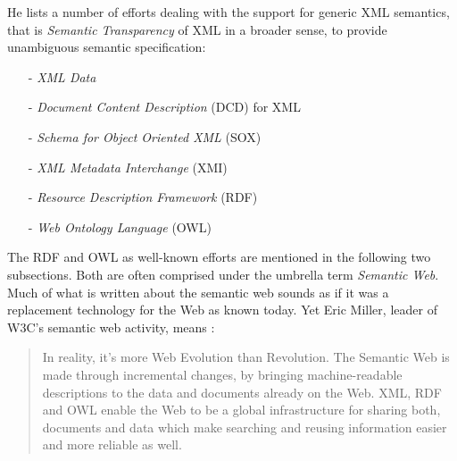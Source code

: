 He lists a number of efforts dealing with the support for generic XML semantics,
that is \emph{Semantic Transparency} of XML in a broader sense, to provide
unambiguous semantic specification:

\begin{itemize}
    \item[-] \emph{XML Data} \cite{xmldata}
    \item[-] \emph{Document Content Description} (DCD) for XML \cite{dcd}
    \item[-] \emph{Schema for Object Oriented XML} (SOX) \cite{sox}
    \item[-] \emph{XML Metadata Interchange} (XMI) \cite{mda}
    \item[-] \emph{Resource Description Framework} (RDF) \cite{rdf}
    \item[-] \emph{Web Ontology Language} (OWL) \cite{owl}
\end{itemize}

The RDF and OWL as well-known efforts are mentioned in the following two
subsections. Both are often comprised under the umbrella term
\emph{Semantic Web}. Much of what is written about the semantic web sounds as
if it was a replacement technology for the Web as known today. Yet Eric Miller,
leader of W3C's semantic web activity, means \cite{rdfowlrelease}:

\begin{quote}
    In reality, it's more Web Evolution than Revolution. The Semantic Web is
    made through incremental changes, by bringing machine-readable descriptions
    to the data and documents already on the Web. XML, RDF and OWL enable the
    Web to be a global infrastructure for sharing both, documents and data which
    make searching and reusing information easier and more reliable as well.
\end{quote}



